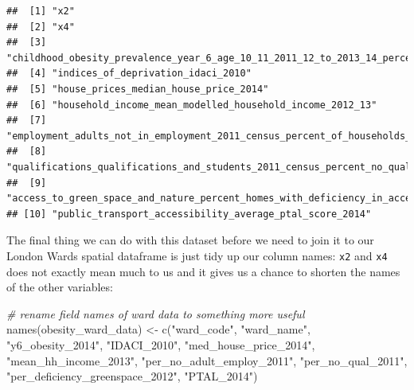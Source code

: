 \documentclass[
]{book}
\newenvironment{Shaded}{\begin{snugshade}}{\end{snugshade}}
\newcommand{\CommentTok}[1]{\textcolor[rgb]{0.56,0.35,0.01}{\textit{#1}}}
\newcommand{\FunctionTok}[1]{\textcolor[rgb]{0.00,0.00,0.00}{#1}}
\newcommand{\NormalTok}[1]{#1}
\newcommand{\OtherTok}[1]{\textcolor[rgb]{0.56,0.35,0.01}{#1}}
\newcommand{\StringTok}[1]{\textcolor[rgb]{0.31,0.60,0.02}{#1}}
\begin{document}
\begin{verbatim}
##  [1] "x2"                                                                                                                        
##  [2] "x4"                                                                                                                        
##  [3] "childhood_obesity_prevalence_year_6_age_10_11_2011_12_to_2013_14_percent_obese"                                            
##  [4] "indices_of_deprivation_idaci_2010"                                                                                         
##  [5] "house_prices_median_house_price_2014"                                                                                      
##  [6] "household_income_mean_modelled_household_income_2012_13"                                                                   
##  [7] "employment_adults_not_in_employment_2011_census_percent_of_households_with_no_adults_in_employment_with_dependent_children"
##  [8] "qualifications_qualifications_and_students_2011_census_percent_no_qualifications"                                          
##  [9] "access_to_green_space_and_nature_percent_homes_with_deficiency_in_access_to_nature_2012"                                   
## [10] "public_transport_accessibility_average_ptal_score_2014"
\end{verbatim}

The final thing we can do with this dataset before we need to join it to our London Wards spatial dataframe is just tidy up our column names: \texttt{x2} and \texttt{x4} does not exactly mean much to us and it gives us a chance to shorten the names of the other variables:

\begin{Shaded}
\begin{Highlighting}[]
\CommentTok{\# rename field names of ward data to something more useful}
\FunctionTok{names}\NormalTok{(obesity\_ward\_data) }\OtherTok{\textless{}{-}} \FunctionTok{c}\NormalTok{(}\StringTok{"ward\_code"}\NormalTok{, }\StringTok{"ward\_name"}\NormalTok{, }\StringTok{"y6\_obesity\_2014"}\NormalTok{, }\StringTok{"IDACI\_2010"}\NormalTok{,}
    \StringTok{"med\_house\_price\_2014"}\NormalTok{, }\StringTok{"mean\_hh\_income\_2013"}\NormalTok{, }\StringTok{"per\_no\_adult\_employ\_2011"}\NormalTok{,}
    \StringTok{"per\_no\_qual\_2011"}\NormalTok{, }\StringTok{"per\_deficiency\_greenspace\_2012"}\NormalTok{, }\StringTok{"PTAL\_2014"}\NormalTok{)}
\end{Highlighting}
\end{Shaded}
\end{document}
